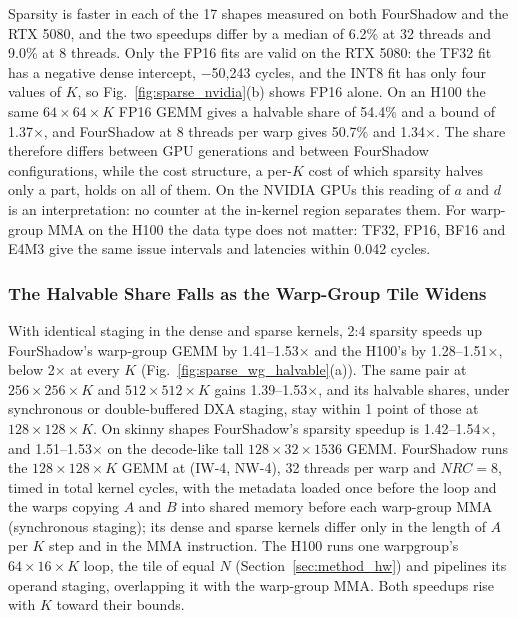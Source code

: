 Sparsity is faster in each of the 17 shapes measured on both FourShadow and the RTX 5080, and the two speedups differ by a median of 6.2\% at 32 threads and 9.0\% at 8 threads. Only the FP16 fits are valid on the RTX 5080: the TF32 fit has a negative dense intercept, $-$50,243 cycles, and the INT8 fit has only four values of $K$, so Fig.~\ref{fig:sparse_nvidia}(b) shows FP16 alone. On an H100 the same $64{\times}64{\times}K$ FP16 GEMM gives a halvable share of 54.4\% and a bound of 1.37$\times$, and FourShadow at 8 threads per warp gives 50.7\% and 1.34$\times$. The share therefore differs between GPU generations and between FourShadow configurations, while the cost structure, a per-$K$ cost of which sparsity halves only a part, holds on all of them. On the NVIDIA GPUs this reading of $a$ and $d$ is an interpretation: no counter at the in-kernel region separates them. For warp-group MMA on the H100 the data type does not matter: TF32, FP16, BF16 and E4M3 give the same issue intervals and latencies within 0.042 cycles.


\subsubsection{The Halvable Share Falls as the Warp-Group Tile Widens}\label{sec:eval_sparse_wg}

With identical staging in the dense and sparse kernels, 2:4 sparsity speeds up FourShadow's warp-group GEMM by 1.41--1.53$\times$ and the H100's by 1.28--1.51$\times$, below 2$\times$ at every $K$ (Fig.~\ref{fig:sparse_wg_halvable}(a)). \label{sec:large_wg}The same pair at $256{\times}256{\times}K$ and $512{\times}512{\times}K$ gains 1.39--1.53$\times$, and its halvable shares, under synchronous or double-buffered DXA staging, stay within 1 point of those at $128{\times}128{\times}K$. \label{sec:skinny_sparse}On skinny shapes FourShadow's sparsity speedup is 1.42--1.54$\times$, and 1.51--1.53$\times$ on the decode-like tall $128{\times}32{\times}1536$ GEMM.
FourShadow runs the $128{\times}128{\times}K$ GEMM at (IW-4, NW-4), 32 threads per warp and $\mathit{NRC}{=}8$, timed in total kernel cycles, with the metadata loaded once before the loop and the warps copying $A$ and $B$ into shared memory before each warp-group MMA (synchronous staging); its dense and sparse kernels differ only in the length of $A$ per $K$ step and in the MMA instruction. The H100 runs one warpgroup's $64{\times}16{\times}K$ loop, the tile of equal $N$ (Section~\ref{sec:method_hw}) and pipelines its operand staging, overlapping it with the warp-group MMA. Both speedups rise with $K$ toward their bounds.

